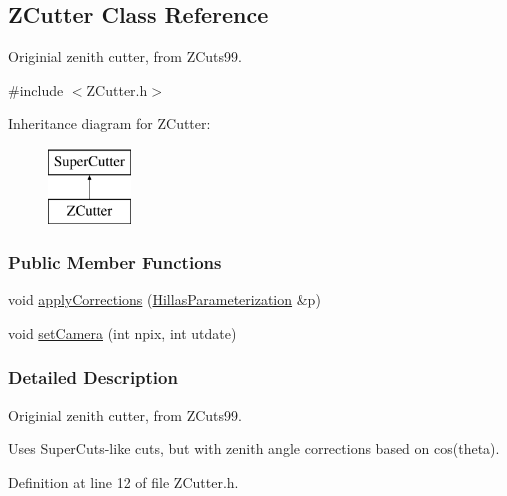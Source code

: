 \hypertarget{classZCutter}{
\subsection{ZCutter Class Reference}
\label{classZCutter}
}


Originial zenith cutter, from ZCuts99.  




{\ttfamily \#include $<$ZCutter.h$>$}

Inheritance diagram for ZCutter:\begin{figure}[H]
\begin{center}
\leavevmode
\includegraphics[height=2.000000cm]{classZCutter}
\end{center}
\end{figure}
\subsubsection*{Public Member Functions}
\begin{DoxyCompactItemize}
\item 
void \hyperlink{classZCutter_ad8fc95579fc4b47a518b66e6ea029f61}{applyCorrections} (\hyperlink{structHillasParameterization}{HillasParameterization} \&p)
\item 
\hypertarget{classZCutter_a49d8a4c5de1b717afedb79a2ed00d53e}{
void \hyperlink{classZCutter_a49d8a4c5de1b717afedb79a2ed00d53e}{setCamera} (int npix, int utdate)}
\label{classZCutter_a49d8a4c5de1b717afedb79a2ed00d53e}

\end{DoxyCompactItemize}


\subsubsection{Detailed Description}
Originial zenith cutter, from ZCuts99. 

Uses SuperCuts-\/like cuts, but with zenith angle corrections based on cos(theta). 

Definition at line 12 of file ZCutter.h.



